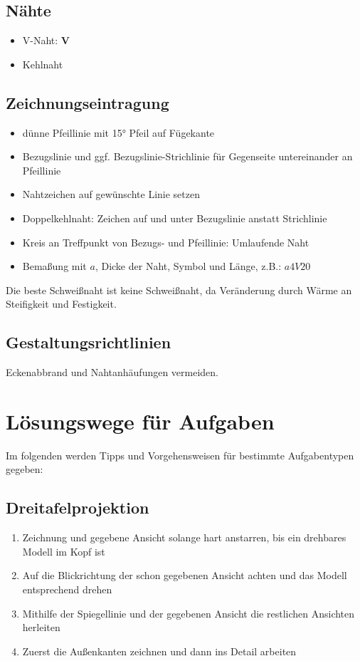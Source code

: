 \documentclass[a4paper,parskip=half*,DIV=7,fontsize=11pt]{scrartcl}
\begin{document}
\subsection{Nähte}
\begin{itemize}
	\item V-Naht: \textbf{V}
	\item Kehlnaht
\end{itemize}
	
\subsection{Zeichnungseintragung}
\begin{itemize}
	\item dünne Pfeillinie mit 15° Pfeil auf Fügekante
	\item Bezugslinie und ggf. Bezugslinie-Strichlinie für Gegenseite untereinander an Pfeillinie
	\item Nahtzeichen auf gewünschte Linie setzen
	\item Doppelkehlnaht: Zeichen auf und unter Bezugslinie anstatt Strichlinie
	\item Kreis an Treffpunkt von Bezugs- und Pfeillinie: Umlaufende Naht
	\item Bemaßung mit $a$, Dicke der Naht, Symbol und Länge, z.B.: $a4V20$
\end{itemize}
Die beste Schweißnaht ist keine Schweißnaht, da Veränderung durch Wärme an Steifigkeit und Festigkeit.

\subsection{Gestaltungsrichtlinien}
Eckenabbrand und Nahtanhäufungen vermeiden.

\pagebreak
\section{Lösungswege für Aufgaben}
Im folgenden werden Tipps und Vorgehensweisen für bestimmte Aufgabentypen gegeben:
\subsection{Dreitafelprojektion}
\begin{enumerate}
	\item Zeichnung und gegebene Ansicht solange hart anstarren, bis ein drehbares Modell im Kopf ist
	\item Auf die Blickrichtung der schon gegebenen Ansicht achten und das Modell entsprechend drehen
	\item Mithilfe der Spiegellinie und der gegebenen Ansicht die restlichen Ansichten herleiten
	\item Zuerst die Außenkanten zeichnen und dann ins Detail arbeiten
\end{enumerate}
\end{document}
